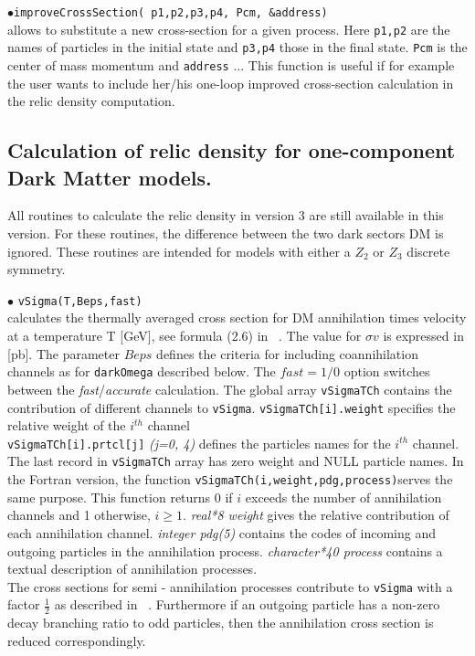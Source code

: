 \documentclass[12pt,a4paper]{article}
\begin{document}
\noindent$\bullet$\verb|improveCrossSection( p1,p2,p3,p4, Pcm, &address)|\\
allows to substitute a new cross-section for a given process. Here \verb|p1,p2| are the names of particles in the initial state and \verb|p3,p4| those in the final state. \verb|Pcm| is the center of mass momentum and \verb|address| ... This function is useful if for example the user wants to include her/his one-loop improved cross-section calculation in the relic density computation.


\subsection{Calculation of relic density for one-component Dark Matter models.}
\label{sec:one_component}
All routines to calculate the relic density in  version 3 are still available in this version. For these routines,  the difference between 
the two dark sectors DM is ignored. These routines are intended for models with either a $Z_2$ or $Z_3$ discrete symmetry.
  
\noindent
$\bullet$ \verb|vSigma(T,Beps,fast)|\\
calculates the thermally averaged cross section for DM annihilation  times velocity  
at a  temperature T [GeV], see formula (2.6) in ~\cite{Belanger:2001fz}. The value for $\sigma v$ 
is expressed in [pb].  The parameter $Beps$ defines the criteria for including coannihilation
channels as for {\tt darkOmega} described below.
The $fast=1/0$ option switches between the {\it fast}/{\it accurate} calculation. 
The global array {\tt vSigmaTCh} contains the 
contribution of different channels to {\tt vSigma}. \verb|vSigmaTCh[i].weight| specifies the relative
weight of the $i^{th}$ channel \\
\verb|vSigmaTCh[i].prtcl[j]|  {\it (j=0, 4)}  defines the particles names for the $i^{th}$
channel.\\
The last record in \verb|vSigmaTCh| array has zero weight and 
NULL particle names.  In the Fortran version, the function 
 \verb|vSigmaTCh(i,weight,pdg,process)|serves the same purpose.  This function returns 0
if $i$  exceeds the number of annihilation  channels and 1 otherwise, $i\ge 1$. 
 {\it real*8 weight} gives the relative contribution of each
annihilation channel. {\it integer pdg(5)} contains the codes of incoming and
outgoing particles in the  annihilation process.  {\it character*40  process}
contains a textual description of annihilation processes.\\
The cross sections for  semi - annihilation processes  contribute to {\tt vSigma} with a
factor $\frac{1}{2}$ as described in ~\cite{Belanger:2012vp}. Furthermore if an outgoing particle has a non-zero
decay branching ratio to  odd particles, then the  annihilation  cross section  is reduced
correspondingly.\\
\end{document}
